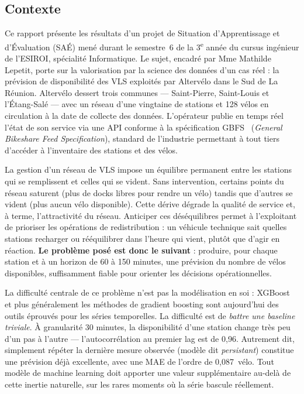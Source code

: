 \documentclass[fleqn, 12pt]{scrartcl}
\newcommand{\ent}{Altervélo\xspace}
\begin{document}
\subsection*{Contexte}

Ce rapport présente les résultats d'un projet de Situation d'Apprentissage et d'Évaluation (SAÉ) mené durant le semestre~6 de la 3\textsuperscript{e} année du cursus ingénieur de l'ESIROI, spécialité Informatique. Le sujet, encadré par Mme Mathilde Lepetit, porte sur la valorisation par la science des données d'un cas réel : la prévision de disponibilité des VLS exploités par \ent dans le Sud de La Réunion.
%
\ent dessert trois communes --- Saint-Pierre, Saint-Louis et l'Étang-Salé --- avec un réseau d'une vingtaine de stations et 128 vélos en circulation à la date de collecte des données.
%
L'opérateur publie en temps réel l'état de son service via une API conforme à la spécification GBFS~\cite{gbfs_spec} (\textit{General Bikeshare Feed Specification}), standard de l'industrie permettant à tout tiers d'accéder à l'inventaire des stations et des vélos.

\vspace{0.3cm}

La gestion d'un réseau de VLS impose un équilibre permanent entre les stations qui se remplissent et celles qui se vident. Sans intervention, certains points du réseau saturent (plus de docks libres pour rendre un vélo) tandis que d'autres se vident (plus aucun vélo disponible). Cette dérive dégrade la qualité de service et, à terme, l'attractivité du réseau.
%
Anticiper ces déséquilibres permet à l'exploitant de prioriser les opérations de redistribution : un véhicule technique sait quelles stations recharger ou rééquilibrer dans l'heure qui vient, plutôt que d'agir en réaction.
%
\textbf{Le problème posé est donc le suivant} : produire, pour chaque station et à un horizon de 60 à 150 minutes, une prévision du nombre de vélos disponibles, suffisamment fiable pour orienter les décisions opérationnelles.

\vspace{0.3cm}

La difficulté centrale de ce problème n'est pas la modélisation en soi : XGBoost~\cite{chen_xgboost_2016} et plus généralement les méthodes de gradient boosting sont aujourd'hui des outils éprouvés pour les séries temporelles. La difficulté est de \emph{battre une baseline triviale}. À granularité 30 minutes, la disponibilité d'une station change très peu d'un pas à l'autre --- l'autocorrélation au premier lag est de 0{,}96. Autrement dit, simplement répéter la dernière mesure observée (modèle dit \emph{persistant}) constitue une prévision déjà excellente, avec une MAE de l'ordre de 0{,}087~vélo. Tout modèle de machine learning doit apporter une valeur supplémentaire au-delà de cette inertie naturelle, sur les rares moments où la série bascule réellement.
\end{document}

